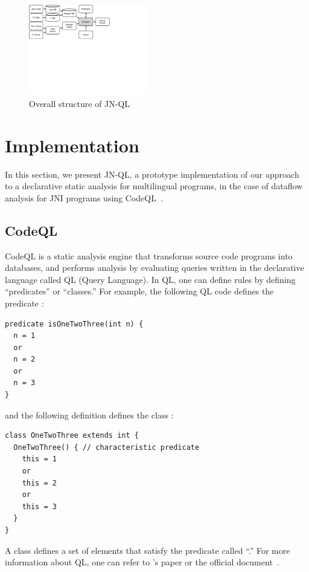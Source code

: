 \begin{figure}[t]
  \centering
  \vspace{2mm}
  \includegraphics[width=0.47\textwidth]{img/codeql}
  \caption{Overall structure of JN-QL}
  \label{fig:codeql}
\end{figure}

\section{Implementation}\label{sec:impl}
In this section, we present JN-QL, a prototype implementation of our
approach to a declarative static analysis for multilingual programs,
in the case of dataflow analysis for JNI programs using CodeQL~\cite{codeql}.

\subsection{CodeQL}
CodeQL is a static analysis engine that transforms source code
programs into databases, and performs analysis by evaluating queries
written in the declarative language called QL (Query Language).
In QL, one can define rules by defining ``predicates'' or ``classes.''
For example, the following QL code defines the predicate :
\begin{lstlisting}[style=codeql,xleftmargin=2.5em]
predicate isOneTwoThree(int n) {
  n = 1
  or
  n = 2
  or
  n = 3
}
\end{lstlisting}
and the following definition defines the class :
\begin{lstlisting}[style=codeql,xleftmargin=2.5em]
class OneTwoThree extends int {
  OneTwoThree() { // characteristic predicate
    this = 1
    or
    this = 2
    or
    this = 3
  }
}
\end{lstlisting}
A class defines a set of elements that satisfy the predicate called
``.''
For more information about QL, one can refer to \citet{ql2016}'s paper
or the official document~\cite{codeql}.

